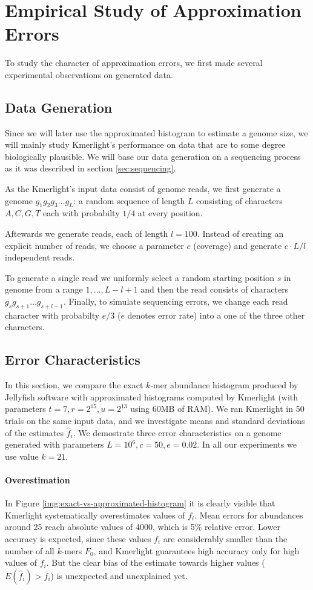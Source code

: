 \section{Empirical Study of Approximation Errors}
To study the character of approximation errors, we first made several experimental
observations on generated data.

\subsection{Data Generation}
\label{sec:data-generation}
Since we will later use the approximated histogram to estimate a genome size, 
we will mainly study Kmerlight's performance on data that are to some
degree biologically plausible. We will base our data generation on a sequencing
process as it was described in section \ref{sec:sequencing}.

As the Kmerlight's input data consist of genome reads, we first generate a genome 
$g_1g_2g_3 \dots g_L$: a random sequence of length $L$ consisting of characters $A, C, G, T$ 
each with probabilty $1/4$ at every position.

Aftewards we generate reads, each of length $l=100$. Instead of creating an explicit number
of reads, we choose a parameter $c$ (coverage) and generate $c \cdot L / l$ independent reads.

To generate a single read we uniformly select a random starting position $s$ in genome from
a range $1, \dots, L - l + 1$ and then the read consists of characters
$g_s g_{s+1} \dots g_{s+l-1}$. Finally, to simulate sequencing errors, we change each read
character with probabilty $e/3$ ($e$ denotes error rate) into a one of the three other characters.


\subsection{Error Characteristics}
\label{sec:error-characteristics}
In this section, we compare the exact $k$-mer abundance histogram produced by Jellyfish software
\cite{Marcais2011}
with approximated histograms computed by Kmerlight (with parameters $t=7, r=2^{15}, u=2^{13}$ using
60MB of RAM). We ran Kmerlight in 50 trials on the same input data, and we investigate means and
standard deviations of the estimates $\hat f_i$. We demostrate three error characteristics
on a genome generated with parameters $L=10^6, c=50, e=0.02$. In all our experiments we
use value $k=21$.

\paragraph{Overestimation}
In Figure \ref{img:exact-vs-approximated-histogram} it is clearly visible that Kmerlight
systematically overestimates values of $f_i$. Mean errors for abundances around 25 reach
absolute values of 4000, which is 5\% relative error. Lower accuracy is expected, since these values
$f_i$ are considerably smaller than the number of all $k$-mers $F_0$, and Kmerlight guarantees
high accuracy only for high values of $f_i$. But the clear bias of the estimate towards higher
values ($E(\hat f_i) > f_i$) is unexpected and unexplained yet.  


